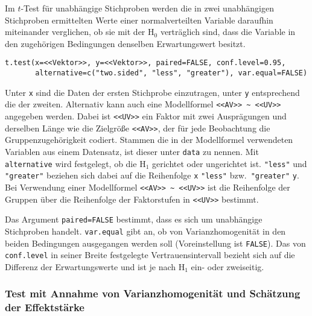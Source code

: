 Im $t$-Test für unabhängige Stichproben werden die in zwei unabhängigen Stichproben ermittelten Werte einer normalverteilten Variable daraufhin miteinander verglichen, ob sie mit der $\text{H}_{0}$ verträglich sind, dass die Variable in den zugehörigen Bedingungen denselben Erwartungswert besitzt.
\begin{lstlisting}
t.test(x=<<Vektor>>, y=<<Vektor>>, paired=FALSE, conf.level=0.95,
       alternative=c("two.sided", "less", "greater"), var.equal=FALSE)
\end{lstlisting}

Unter \lstinline!x! sind die Daten der ersten Stichprobe einzutragen, unter \lstinline!y! entsprechend die der zweiten. Alternativ kann auch eine Modellformel \lstinline!<<AV>> ~ <<UV>>! angegeben werden. Dabei ist \lstinline!<<UV>>! ein Faktor mit zwei Ausprägungen und derselben Länge wie die Zielgröße \lstinline!<<AV>>!, der für jede Beobachtung die Gruppenzugehörigkeit codiert. Stammen die in der Modellformel verwendeten Variablen aus einem Datensatz, ist dieser unter \lstinline!data! zu nennen. Mit \lstinline!alternative! wird festgelegt, ob die $\text{H}_{1}$ gerichtet oder ungerichtet ist. \lstinline!"less"! und \lstinline!"greater"! beziehen sich dabei auf die Reihenfolge \lstinline!x! \lstinline!"less"! bzw.\ \lstinline!"greater"! \lstinline!y!. Bei Verwendung einer Modellformel \lstinline!<<AV>> ~ <<UV>>! ist die Reihenfolge der Gruppen über die Reihenfolge der Faktorstufen in \lstinline!<<UV>>! bestimmt.

Das Argument \lstinline!paired=FALSE! bestimmt, dass es sich um unabhängige Stichproben handelt. \lstinline!var.equal! gibt an, ob von Varianzhomogenität in den beiden Bedingungen ausgegangen werden soll (Voreinstellung ist \lstinline!FALSE!). Das von \lstinline!conf.level! in seiner Breite festgelegte Vertrauensintervall bezieht sich auf die Differenz der Erwartungswerte und ist je nach $\text{H}_{1}$ ein- oder zweiseitig.

\subsubsection{Test mit Annahme von Varianzhomogenität und Schätzung der Effektstärke}

